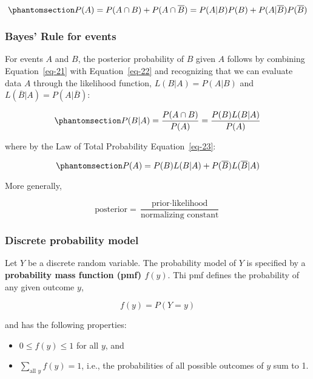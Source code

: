\documentclass[
  letterpaper,
  DIV=11,
  numbers=noendperiod]{scrartcl}
\theoremstyle{definition}
\theoremstyle{remark}
\begin{document}
\begin{equation}\phantomsection\label{eq-23}{
P(A) = P(A \cap B) + P(A \cap \overline{B}) = P(A|B)P(B) + P(A|\overline{B})P(\overline{B})
}\end{equation}

\subsubsection{Bayes' Rule for events}\label{bayes-rule-for-events}

For events \(A\) and \(B\), the posterior probability of \(B\) given
\(A\) follows by combining Equation~\ref{eq-21} with
Equation~\ref{eq-22} and recognizing that we can evaluate data \(A\)
through the likelihood function, \(L(B|A) = P(A|B)\) and
\(L(\overline{B}|A) = P(A|\overline{B})\):

\begin{equation}\phantomsection\label{eq-24}{
P(B|A) = \frac{P(A \cap B)}{P(A)} = \frac{P(B)L(B|A)}{P(A)}
}\end{equation}

where by the Law of Total Probability Equation~\ref{eq-23}:

\begin{equation}\phantomsection\label{eq-25}{
P(A) = P(B)L(B|A) + P(\overline{B})L(\overline{B}|A)
}\end{equation}

More generally,

\[
\text{posterior} = \frac{\text{prior} \cdot \text{likelihood}}{\text{normalizing constant}}
\]

\subsubsection{Discrete probability
model}\label{discrete-probability-model}

Let \(Y\) be a discrete random variable. The probability model of \(Y\)
is specified by a \textbf{probability mass function (pmf) \(f(y)\)}. Thi
pmf defines the probability of any given outcome \(y\),

\[
f(y) = P(Y = y)
\]

and has the following properties:

\begin{itemize}
\item
  \(0 \leq f(y) \leq 1\) for all \(y\), and
\item
  \(\sum_{\text{all } y}f(y) = 1\), i.e., the probabilities of all
  possible outcomes of \(y\) sum to 1.
\end{itemize}
\end{document}
